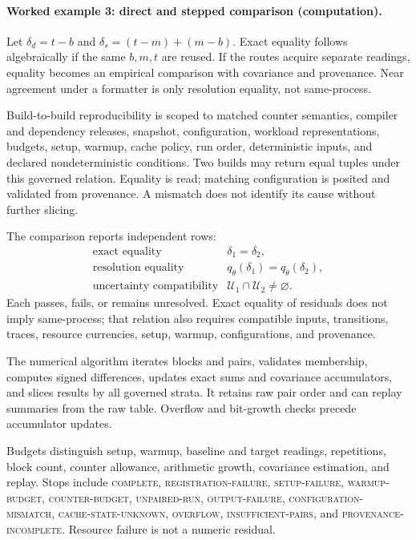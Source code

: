 \paragraph{Worked example 3: direct and stepped comparison (computation).}
Let \(\delta_d=t-b\) and \(\delta_s=(t-m)+(m-b)\).  Exact equality follows algebraically if the same \(b,m,t\) are
reused.  If the routes acquire separate readings, equality becomes an empirical comparison with covariance and
provenance.  Near agreement under a formatter is only resolution equality, not same-process.

Build-to-build reproducibility is scoped to matched counter semantics, compiler and dependency releases, snapshot,
configuration, workload representations, budgets, setup, warmup, cache policy, run order, deterministic inputs, and
declared nondeterministic conditions.  Two builds may return equal tuples under this governed relation.  Equality is
read; matching configuration is posited and validated from provenance.  A mismatch does not identify its cause
without further slicing.

The comparison reports independent rows:
\[
\begin{array}{ll}
\text{exact equality}&\delta_1=\delta_2,\\
\text{resolution equality}&q_\theta(\delta_1)=q_\theta(\delta_2),\\
\text{uncertainty compatibility}&\mathcal U_1\cap\mathcal U_2\ne\varnothing.
\end{array}
\]
Each passes, fails, or remains unresolved.  Exact equality of residuals does not imply same-process; that relation
also requires compatible inputs, transitions, traces, resource currencies, setup, warmup, configurations, and
provenance.

The numerical algorithm iterates blocks and pairs, validates membership, computes signed differences, updates exact
sums and covariance accumulators, and slices results by all governed strata.  It retains raw pair order and can replay
summaries from the raw table.  Overflow and bit-growth checks precede accumulator updates.

Budgets distinguish setup, warmup, baseline and target readings, repetitions, block count, counter allowance,
arithmetic growth, covariance estimation, and replay.  Stops include \textsc{complete}, \textsc{registration-failure},
\textsc{setup-failure}, \textsc{warmup-budget}, \textsc{counter-budget}, \textsc{unpaired-run},
\textsc{output-failure}, \textsc{configuration-mismatch}, \textsc{cache-state-unknown},
\textsc{overflow}, \textsc{insufficient-pairs}, and \textsc{provenance-incomplete}.  Resource failure is not a
numeric residual.

